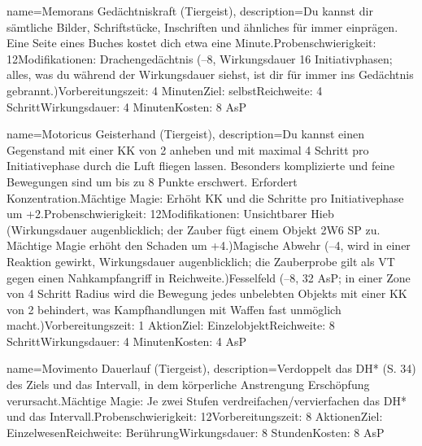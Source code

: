 {
    name={Memorans Gedächtniskraft (Tiergeist)},
    description={Du kannst dir sämtliche Bilder, Schriftstücke, Inschriften und ähnliches für immer einprägen. Eine Seite eines Buches kostet dich etwa eine Minute.\newline Probenschwierigkeit: 12\newline Modifikationen: Drachengedächtnis (–8, Wirkungsdauer 16 Initiativphasen; alles, was du während der Wirkungsdauer siehst, ist dir für immer ins Gedächtnis gebrannt.)\newline Vorbereitungszeit: 4 Minuten\newline Ziel: selbst\newline Reichweite: 4 Schritt\newline Wirkungsdauer: 4 Minuten\newline Kosten: 8 AsP}
}


{
    name={Motoricus Geisterhand (Tiergeist)},
    description={Du kannst einen Gegenstand mit einer KK von 2 anheben und mit maximal 4 Schritt pro Initiativephase durch die Luft fliegen lassen. Besonders komplizierte und feine Bewegungen sind um bis zu 8 Punkte erschwert. Erfordert Konzentration.\newline Mächtige Magie: Erhöht KK und die Schritte pro Initiativephase um +2.\newline Probenschwierigkeit: 12\newline Modifikationen: Unsichtbarer Hieb (Wirkungsdauer augenblicklich; der Zauber fügt einem Objekt 2W6 SP zu. Mächtige Magie erhöht den Schaden um +4.)\newline Magische Abwehr (–4, wird in einer Reaktion gewirkt, Wirkungsdauer augenblicklich; die Zauberprobe gilt als VT gegen einen Nahkampfangriff in Reichweite.)\newline Fesselfeld (–8, 32 AsP; in einer Zone von 4 Schritt Radius wird die Bewegung jedes unbelebten Objekts mit einer KK von 2 behindert, was Kampfhandlungen mit Waffen fast unmöglich macht.)\newline Vorbereitungszeit: 1 Aktion\newline Ziel: Einzelobjekt\newline Reichweite: 8 Schritt\newline Wirkungsdauer: 4 Minuten\newline Kosten: 4 AsP}
}


{
    name={Movimento Dauerlauf (Tiergeist)},
    description={Verdoppelt das DH* (S. 34) des Ziels und das Intervall, in dem körperliche Anstrengung Erschöpfung verursacht.\newline Mächtige Magie: Je zwei Stufen verdreifachen/vervierfachen das DH* und das Intervall.\newline Probenschwierigkeit: 12\newline Vorbereitungszeit: 8 Aktionen\newline Ziel: Einzelwesen\newline Reichweite: Berührung\newline Wirkungsdauer: 8 Stunden\newline Kosten: 8 AsP}
}



